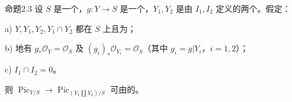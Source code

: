 \begin{SGAresult}{命题}{2.3}
设 $S$ 是一个，$g:Y\to S$ 是一个，$Y_1,Y_2$ 是由 $I_1,I_2$ 定义的两个。假定：

\textup{a)} $Y,Y_1,Y_2,Y_1\cap Y_2$ 都在 $S$ 上且为；

\textup{b)} 地有 $g_*\mathcal O_Y=\mathcal O_S$ 及 $(g_i)_*\mathcal O_{Y_i}=\mathcal O_S$（其中 $g_i=g|Y_i$，$i=1,2$）；

\textup{c)} $I_1\cap I_2=0$。

则 $\operatorname{Pic}_{Y/S}\to\operatorname{Pic}_{(Y_1\amalg Y_2)/S}$ 可由的。
\end{SGAresult}
